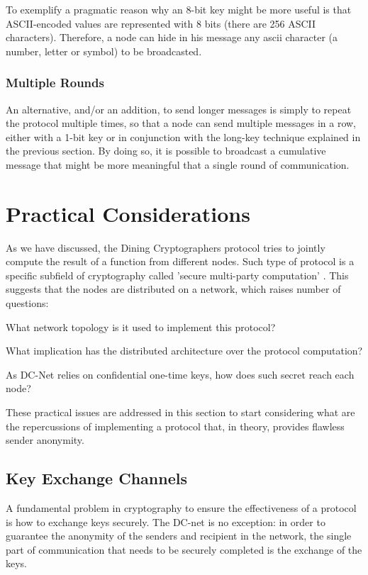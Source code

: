 To exemplify a pragmatic reason why an 8-bit key might be more useful is that ASCII-encoded values are represented with 8 bits (there are 256 ASCII characters). Therefore, a node can hide in his message any ascii character (a number, letter or symbol) to be broadcasted.


\subsubsection{Multiple Rounds} \label{sec:messageExtentionRounds}
An alternative, and/or an addition, to send longer messages is simply to repeat the protocol multiple times, so that a node can send multiple messages in a row, either with a 1-bit key or in conjunction with the long-key technique explained in the previous section. By doing so, it is possible to broadcast a cumulative message that might be more meaningful that a single round of communication.



\section{Practical Considerations}
As we have discussed, the Dining Cryptographers protocol tries to jointly compute the result of a function from different nodes. Such type of protocol is a specific subfield of cryptography called 'secure multi-party computation' \cite{wiki1}. This suggests that the nodes are distributed on a network, which raises number of questions: 

What network topology is it used to implement this protocol? 

What implication has the distributed architecture over the protocol computation? 

As DC-Net relies on confidential one-time keys, how does such secret reach each node?

\noindent \newline These practical issues are addressed in this section to start considering what are the repercussions of implementing a protocol that, in theory, provides flawless sender anonymity.


\subsection{Key Exchange Channels} \label{sec:keyExchangeMethods}
A fundamental problem in cryptography to ensure the effectiveness of a protocol is how to exchange keys securely. The DC-net is no exception: in order to guarantee the anonymity of the senders and recipient in the network, the single part of communication that needs to be securely completed is the exchange of the keys.

